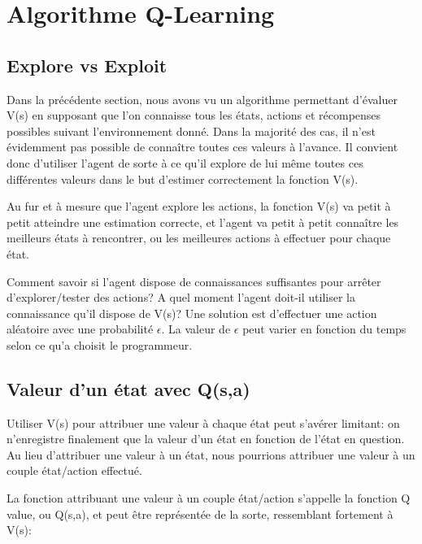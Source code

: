 \documentclass[11pt,a4paper]{report}
\begin{document}
  \section{Algorithme Q-Learning}
  
  \subsection{Explore vs Exploit} 
  
    \par Dans la précédente section, nous avons vu un algorithme permettant d'évaluer V(s) en supposant que l'on connaisse tous les états, actions et récompenses possibles suivant l'environnement donné. Dans la majorité des cas, il n'est évidemment pas possible de connaître toutes ces valeurs à l'avance. Il convient donc d'utiliser l'agent de sorte à ce qu'il explore de lui même toutes ces différentes valeurs dans le but d'estimer correctement la fonction V(s).     
    
    \par Au fur et à mesure que l'agent explore les actions, la fonction V(s) va petit à petit atteindre une estimation correcte, et l'agent va petit à petit connaître les meilleurs états à rencontrer, ou les meilleures actions à effectuer pour chaque état. 
    
    \par Comment savoir si l'agent dispose de connaissances suffisantes pour arrêter d'explorer/tester des actions? A quel moment l'agent doit-il utiliser la connaissance qu'il dispose de V(s)? Une solution est d'effectuer une action aléatoire avec une probabilité $\epsilon$. La valeur de $\epsilon$ peut varier en fonction du temps selon ce qu'a choisit le programmeur. 
  
  \subsection{Valeur d'un état avec Q(s,a)}
  
    \par Utiliser V(s) pour attribuer une valeur à chaque état peut s'avérer limitant: on n'enregistre finalement que la valeur d'un état en fonction de l'état en question. Au lieu d'attribuer une valeur à un état, nous pourrions attribuer une valeur à un couple état/action effectué. 
    
    \par La fonction attribuant une valeur à un couple état/action s'appelle la fonction Q value, ou Q(s,a), et peut être représentée de la sorte, ressemblant fortement à V(s): 
        
\end{document}
